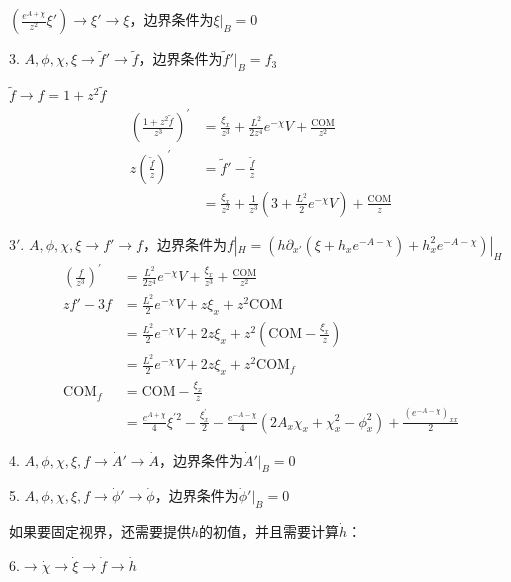 \documentclass[12pt,a4paper]{ctexart}
\numberwithin{equation}{section}
\begin{document}
$\left(\frac{e^{A+\chi}}{z^2}\xi'\right)\rightarrow\xi'\rightarrow\xi$，边界条件为$\xi|_B=0$

3. $A,\phi,\chi,\xi\rightarrow\tilde{f}'\rightarrow\tilde{f}$，边界条件为$\tilde{f}'|_B=f_3$

$\tilde{f}\rightarrow f=1+z^2\tilde{f}$
\begin{equation}
    \begin{aligned}
        (\frac{1+z^2\tilde{f}}{z^{3}})^{\prime}&=\frac{\xi_{x}}{z^{3}}+\frac{L^{2}}{2z^{4}}e^{-\chi}V+\frac{\mathrm{COM}}{z^{2}}\\
        z(\frac{\tilde{f}}{z})^{\prime}&=\tilde{f}'-\frac{\tilde
        {f}}{z}\\
        &=\frac{\xi_{x}}{z^2}+\frac{1}{z^3}(3+\frac{L^{2}}{2}e^{-\chi}V)+\frac{\mathrm{COM}}{z}
    \end{aligned}
\end{equation}

$3'$. $A,\phi,\chi,\xi\rightarrow f'\rightarrow f$，边界条件为$f|_H=(h\partial_{x'}(\xi+h_{x}e^{-A-\chi})+h_{x}^{2}e^{-A-\chi})|_H$
\begin{equation}
    \begin{aligned}
        (\frac{f}{z^{3}})^{\prime}&=\frac{L^{2}}{2z^{4}}e^{-\chi}V+\frac{\xi_{x}}{z^{3}}+\frac{\mathrm{COM}}{z^{2}}\\
        zf'-3f&=\frac{L^{2}}{2}e^{-\chi}V+z\xi_{x}+z^2\mathrm{COM}\\
        &=\frac{L^{2}}{2}e^{-\chi}V+2z\xi_{x}+z^2(\mathrm{COM}-\frac{\xi_x}{z})\\
        &=\frac{L^{2}}{2}e^{-\chi}V+2z\xi_{x}+z^2\mathrm{COM}_f\\
        \mathrm{COM}_f&=\mathrm{COM}-\frac{\xi_x}{z}\\
        &=\frac{e^{A+\chi}}{4}\xi^{\prime2}-\frac{\xi_{x}^{\prime}}{2}-\frac{e^{-A-\chi}}{4}(2A_x\chi_x+\chi_{x}^2-\phi_x^2)+\frac{(e^{-A-\chi})_{xx}}{2}
    \end{aligned}
\end{equation}

4. $A,\phi,\chi,\xi,f\rightarrow \dot{A}'\rightarrow \dot{A}$，边界条件为$\dot{A}'|_B=0$

5. $A,\phi,\chi,\xi,f\rightarrow \dot{\phi}'\rightarrow \dot{\phi}$，边界条件为$\dot{\phi}'|_B=0$

如果要固定视界，还需要提供$h$的初值，并且需要计算$\dot{h}$：

6.$\rightarrow\dot{\chi}\rightarrow\dot{\xi}\rightarrow\dot{f}\rightarrow\dot{h}$
\end{document}
